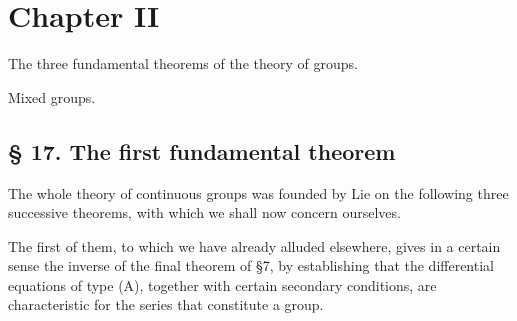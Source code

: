 \documentclass[11pt]{book}
\begin{document}
\chapter*{Chapter II}

\begin{center}
\begin{minipage}{0.88\linewidth}
\centering
The three fundamental theorems of the theory of groups.\par
Mixed groups.
\end{minipage}
\end{center}

\section*{\S{} 17. The first fundamental theorem}

The whole theory of continuous groups was founded by Lie on the following three successive theorems, with which we shall now concern ourselves.

The first of them, to which we have already alluded elsewhere, gives in a certain sense the inverse of the final theorem of \S{}7, by establishing that the differential equations of type (A), together with certain secondary conditions, are characteristic for the series that constitute a group.
\end{document}
